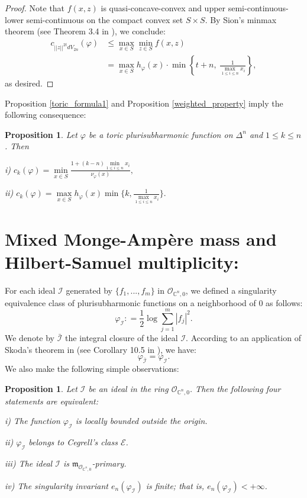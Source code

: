 \documentclass[a4paper,oneside,reqno,11pt]{article}
\newtheorem{proposition}[theorem]{Proposition}
\def\n{\noindent}
\def\n{\noindent}
\begin{document}
\begin{proof}
	Note that $ f(x, z) $ is quasi-concave-convex and upper semi-continuous-lower semi-continuous on the compact convex set $ S \times S $. By Sion's minmax theorem (see Theorem 3.4 in \cite{Si58}), we conclude:
	$$
	\begin{aligned}
		c_{ ||z||^{2t} dV_{2n} } (\varphi)
		&\leq \max_{x \in S} \min_{z \in S} f(x, z) \\
		&= \max_{x \in S} h_{\varphi}(x) \cdot \min \left\{ t+n,\ \frac{1}{\max_{1 \leq i \leq n} x_i} \right\},
	\end{aligned}
	$$
	as desired.
\end{proof}

Proposition \ref{toric_formula1} and Proposition \ref{weighted_property} imply the following consequence:

\begin{proposition}\label{toric_formula2} Let $\varphi$ be a toric plurisubharmonic function on $\Delta^n$ and $1\leq k\leq n$. Then 

\n
i) $c_{ k } ( \varphi ) = \min\limits_{ x\in S } \frac { 1 + ( k -n ) \min\limits_{ 1\leq i \leq n } x_i } { \nu_{ \varphi } ( x ) },$

\n
ii) $c_{ k } ( \varphi ) = \max\limits_{ x\in S } h_{ \varphi }  ( x ) \min \{ k , \frac { 1 } { \max\limits_{1\leq i \leq n} x_i } \}.$
\end{proposition}


\section{Mixed Monge-Amp\`{e}re mass and Hilbert-Samuel multiplicity:}

For each ideal $\mathcal I$ generated by $\{ f_1,...,f_m\}$ in ${\mathcal O}_{\mathbb C^n,0}$, we defined a singularity equivalence class of plurisubharmonic functions on a neighborhood of $0$ as follows:
$$\varphi_{\mathcal I}: = \frac 1 2 \log \sum_{j=1}^m | f_j |^2.$$
We denote by $\bar{\mathcal{I}}$ the integral closure of the ideal $\mathcal{I}$. According to an application of Skoda's theorem in \cite{Sk78} (see Corollary 10.5 in \cite{De12}), we have:
$$\varphi_{\bar { \mathcal I } }= \varphi_{\mathcal I}.$$
We also make the following simple observations:

\begin{proposition}\label{pro1} Let $\mathcal{I}$ be an ideal in the ring ${\mathcal{O}}_{\mathbb{C}^n, 0}$. Then the following four statements are equivalent:
	
	i) The function $\varphi_{\mathcal{I}}$ is locally bounded outside the origin.
	
	ii) $\varphi_{\mathcal{I}}$ belongs to Cegrell's class $\mathcal{E}$.
	
	iii) The ideal $\mathcal{I}$ is $\mathfrak{m}_{\mathcal{O}_{\mathbb{C}^n, 0}}$-primary.
	
	iv) The singularity invariant $e_n(\varphi_{\mathcal{I}})$ is finite; that is, $e_n(\varphi_{\mathcal{I}}) < +\infty$.
	
\end{proposition}
\end{document}
